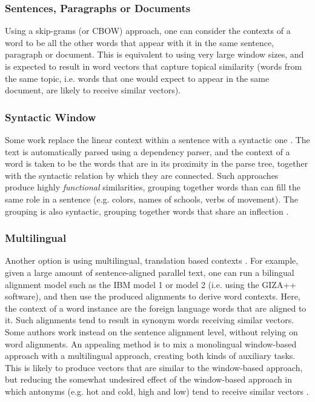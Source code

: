 \documentclass[jair,twoside,11pt,theapa]{article}
\begin{document}
{\subsubsection{Sentences, Paragraphs or Documents} Using a skip-grams (or CBOW)
approach, one can consider the contexts of a word to be all the other words that
appear with it in the same sentence, paragraph or document. This is equivalent
to using very large window sizes, and is expected to result in word vectors that
capture topical similarity (words from the same topic, i.e. words that one would
expect to appear in the same document, are likely to receive similar vectors).

\subsubsection{Syntactic Window} Some work replace the linear context within a
sentence with a syntactic one \cite{levy2014dependencybased,bansal2014tailoring}.
The text is automatically parsed using a
dependency parser, and the context of a word is taken to be the words that are
in its proximity in the parse tree, together with the syntactic relation by
which they are connected. Such approaches produce highly \emph{functional}
similarities, grouping together words than can fill the same role in a sentence
(e.g. colors, names of schools, verbs of movement). The grouping is also
syntactic, grouping together words that share an inflection \cite{levy2014dependencybased}.


\subsubsection{Multilingual} Another option is using multilingual,
translation based contexts \cite{hermann2014multilingual,faruqui2014improving}.
For example, given a large amount of
sentence-aligned parallel text, one can run a bilingual alignment model such as
the IBM model 1 or model 2 (i.e. using the GIZA++ software), and then use the
produced alignments to derive word contexts. Here, the context of a word
instance are the foreign language words that are aligned to it.  Such alignments
tend to result in synonym words receiving similar vectors.  Some authors work instead on
the sentence alignment level, without relying on word alignments. An appealing method
is to mix a monolingual window-based approach with a multilingual approach,
creating both kinds of auxiliary tasks.  This is likely to produce vectors that
are similar to the window-based approach, but reducing the somewhat undesired
effect of the window-based approach in which antonyms (e.g. hot and cold, high
and low) tend to receive similar vectors \cite{faruqui2014improving}.

}
\end{document}

